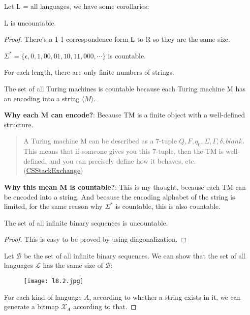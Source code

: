 Let L = all languages, we have some corollaries:
\begin{corollary}
    L is uncountable.
\end{corollary}
\begin{proof}
    There's a 1-1 correspondence form L to R so they are the same size.

    \begin{remark}[Observation]
        \(\Sigma^* = \{ \epsilon, 0, 1, 00, 01, 10, 11, 000, \cdots \} \) is countable. 

        For each length, there are only finite numbers of strings.
    \end{remark}
    \begin{remark}[Observation]
        The set of all Turing machines is countable because each Turing machine M has an encoding into a string \(\langle M \rangle\). 

        \textbf{Why each M can encode?}: Because TM is a finite object with a well-defined structure. \begin{quote}
            A Turing machine M can be described as a 7-tuple \(Q, F, q_0, \Sigma, \Gamma, \delta, blank \). 
            This means that if someone gives you this 7-tuple, then the TM is well-defined, and you can precisely define how it behaves, etc.
            (\href{https://cs.stackexchange.com/a/49616/177809}{CSStackExchange})
        \end{quote}
        
        \textbf{Why this mean M is countable?}: This is my thought, because each TM can be encoded into a string. And because the encoding alphabet of the string is limited, for the same reason why \(\Sigma^*\) is countable, this is also countable. 
    \end{remark}

    \begin{theorem}
        The set of all infinite binary sequences is uncountable.
    \end{theorem}
    \begin{proof}
        This is easy to be proved by using diagonalization.
    \end{proof}

    Let \(\mathcal{B}\) be the set of all infinite binary sequences. 
    We can show that the set of all languages \(\mathcal{L}\) has the same size of \(\mathcal{B}\):

    \begin{figure}[H]
    \centering
    \texttt{[image: l8.2.jpg]}
    \end{figure}

    For each kind of language \(A\), according to whether a string exists in it, we can generate a bitmap \(\mathcal{X}_A\) according to that.  
\end{proof}

